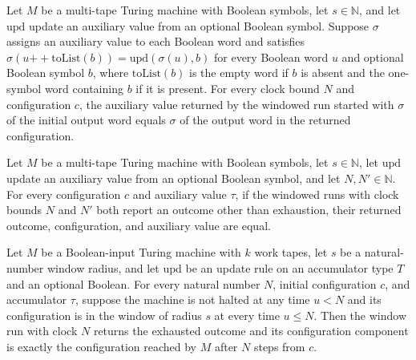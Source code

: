 \begin{theorem}
\label{Turing.windowRun_tag}
\leanok
{}
Let $M$ be a multi-tape Turing machine with Boolean symbols, let $s\in\mathbb{N}$, and
let $\mathrm{upd}$ update an auxiliary value from an optional Boolean symbol. Suppose
$\sigma$ assigns an auxiliary value to each Boolean word and satisfies
$\sigma(u\mathbin{+\!\!+}\mathrm{toList}(b))=\mathrm{upd}(\sigma(u),b)$ for every Boolean word $u$ and
optional Boolean symbol $b$, where $\mathrm{toList}(b)$ is the empty word if $b$ is absent and the one-symbol word containing $b$ if it is present.
For every clock bound $N$ and configuration $c$, the auxiliary value returned by the
windowed run started with $\sigma$ of the initial output word equals $\sigma$ of the
output word in the returned configuration.
\end{theorem}

\begin{theorem}
\label{Turing.windowRun_stop_unique}
\leanok
{}
Let $M$ be a multi-tape Turing machine with Boolean symbols, let $s\in\mathbb{N}$, let
$\mathrm{upd}$ update an auxiliary value from an optional Boolean symbol, and let
$N,N'\in\mathbb{N}$. For every configuration $c$ and auxiliary value $\tau$, if the
windowed runs with clock bounds $N$ and $N'$ both report an outcome other than
exhaustion, their returned outcome, configuration, and auxiliary value are equal.
\end{theorem}

\begin{theorem}
\label{Turing.windowRun_exhausted_of_live}
\leanok
{}
Let $M$ be a Boolean-input Turing machine with $k$ work tapes, let $s$ be a
natural-number window radius, and let $\mathrm{upd}$ be an update rule on an accumulator
type $T$ and an optional Boolean. For every natural number $N$, initial configuration
$c$, and accumulator $\tau$, suppose the machine is not halted at any time $u<N$ and its
configuration is in the window of radius $s$ at every time $u\le N$. Then the window run
with clock $N$ returns the exhausted outcome and its configuration component is exactly
the configuration reached by $M$ after $N$ steps from $c$.
\end{theorem}

